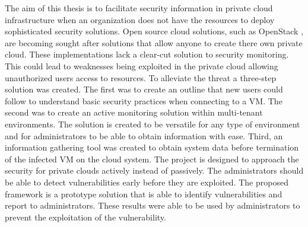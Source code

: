 \documentclass[12pt]{article}
\begin{document}

The aim of this thesis is to facilitate security information in private cloud infrastructure when an organization does not have the resources to deploy sophisticated security solutions. Open source cloud solutions, such as OpenStack \cite{Openstack}, are becoming sought after solutions that allow anyone to create there own private cloud. These implementations lack a clear-cut solution to security monitoring. This could lead to weaknesses being exploited in the private cloud allowing unauthorized users access to resources. To alleviate the threat a three-step solution was created. The first was to create an outline that new users could follow to understand basic security practices when connecting to a VM. The second was to create an active monitoring solution within multi-tenant environments. The solution is created to be versatile for any type of environment and for administrators to be able to obtain information with ease. Third, an information gathering tool was created to obtain system data before termination of the infected VM on the cloud system. The project is designed to approach the security for private clouds actively instead of passively. The administrators should be able to detect vulnerabilities early before they are exploited. The proposed framework is a prototype solution that is able to identify vulnerabilities and report to administrators. These results were able to be used by administrators to prevent the exploitation of the vulnerability.
\end{document}
